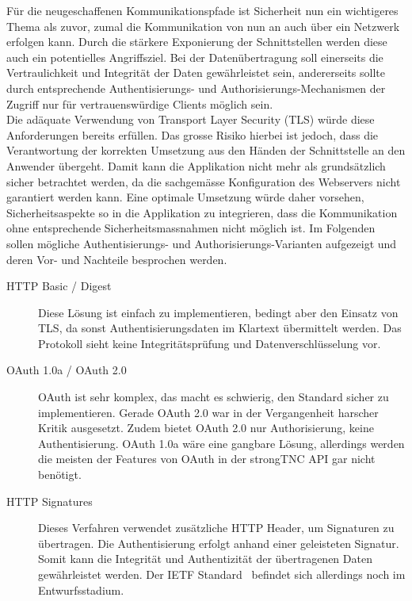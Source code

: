 Für die neugeschaffenen Kommunikationspfade ist Sicherheit nun ein wichtigeres
Thema als zuvor, zumal die Kommunikation von nun an auch über ein Netzwerk
erfolgen kann. Durch die stärkere Exponierung der Schnittstellen werden diese
auch ein potentielles Angriffsziel. Bei der Datenübertragung soll einerseits die
Vertraulichkeit und Integrität der Daten gewährleistet sein, andererseits sollte
durch entsprechende Authentisierungs- und Authorisierungs-Mechanismen der
Zugriff nur für vertrauenswürdige Clients möglich sein. \\ Die adäquate
Verwendung von Transport Layer Security (TLS) würde diese Anforderungen bereits
erfüllen.  Das grosse Risiko hierbei ist jedoch, dass die Verantwortung der
korrekten Umsetzung aus den Händen der Schnittstelle an den Anwender übergeht.
Damit kann die Applikation nicht mehr als grundsätzlich sicher betrachtet
werden, da die sachgemässe Konfiguration des Webservers nicht garantiert werden
kann\cite{owasp2013a5}. Eine optimale Umsetzung würde daher vorsehen,
Sicherheitsaspekte so in die Applikation zu integrieren, dass die Kommunikation
ohne entsprechende Sicherheitsmassnahmen nicht möglich ist. Im Folgenden sollen
mögliche Authentisierungs- und Authorisierungs-Varianten aufgezeigt und deren
Vor- und Nachteile besprochen werden.

\begin{description}

\item [HTTP Basic / Digest] Diese Lösung ist einfach zu implementieren, bedingt
aber den Einsatz von TLS, da sonst Authentisierungsdaten im Klartext übermittelt
werden. Das Protokoll sieht keine Integritätsprüfung und Datenverschlüsselung
vor.

\item [OAuth 1.0a / OAuth 2.0] OAuth ist sehr komplex, das macht es schwierig,
den Standard sicher zu implementieren. Gerade OAuth 2.0 war in der Vergangenheit
harscher Kritik ausgesetzt\cite{hammer2012, homakov2013}. Zudem bietet OAuth 2.0
nur Authorisierung, keine Authentisierung. OAuth 1.0a wäre eine gangbare Lösung,
allerdings werden die meisten der Features von OAuth in der strongTNC API gar
nicht benötigt.

\item [HTTP Signatures] Dieses Verfahren verwendet zusätzliche HTTP Header, um
Signaturen zu übertragen. Die Authentisierung erfolgt anhand einer geleisteten
Signatur. Somit kann die Integrität und Authentizität der übertragenen Daten
gewährleistet werden. Der IETF Standard~\cite{httpsignatures2014} befindet sich allerdings noch im
Entwurfsstadium.

\end{description}

